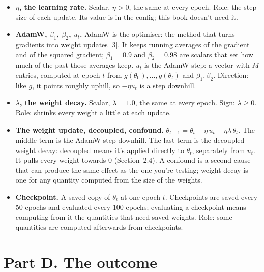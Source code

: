 \documentclass[11pt,a4paper,oneside,openany]{report}
\newcommand{\gl}[1]{\textbf{#1}}   %
\newenvironment{glist}{\begin{itemize}\setlength{\itemsep}{2pt}\setlength{\parskip}{1pt}}{\end{itemize}}
\begin{document}
\begin{glist}
\item[\gl{N17}] \textbf{$\eta$, the learning rate.} Scalar, $\eta > 0$, the same at every epoch. Role: the step size of each update. Its value is in the config; this book doesn't need it.
\item[\gl{N18}] \textbf{AdamW, $\beta_1$, $\beta_2$, $u_t$.} AdamW is the optimiser: the method that turns gradients into weight updates [3]. It keeps running averages of the gradient and of the squared gradient; $\beta_1 = 0.9$ and $\beta_2 = 0.98$ are scalars that set how much of the past those averages keep. $u_t$ is the AdamW step: a vector with $M$ entries, computed at epoch $t$ from $g(\theta_0), \ldots, g(\theta_t)$ and $\beta_1, \beta_2$. Direction: like $g$, it points roughly uphill, so $-\eta u_t$ is a step downhill.
\item[\gl{N19}] \textbf{$\lambda$, the weight decay.} Scalar, $\lambda = 1.0$, the same at every epoch. Sign: $\lambda \ge 0$. Role: shrinks every weight a little at each update.
\item[\gl{N20}] \textbf{The weight update, decoupled, confound.} $\theta_{t+1} = \theta_t - \eta\, u_t - \eta \lambda\, \theta_t$. The middle term is the AdamW step downhill. The last term is the decoupled weight decay: decoupled means it's applied directly to $\theta_t$, separately from $u_t$. It pulls every weight towards 0 (Section~2.4). A confound is a second cause that can produce the same effect as the one you're testing; weight decay is one for any quantity computed from the size of the weights.
\item[\gl{N21}] \textbf{Checkpoint.} A saved copy of $\theta_t$ at one epoch $t$. Checkpoints are saved every 50 epochs and evaluated every 100 epochs; evaluating a checkpoint means computing from it the quantities that need saved weights. Role: some quantities are computed afterwards from checkpoints.
\end{glist}

\section*{Part D. The outcome}
\end{document}
